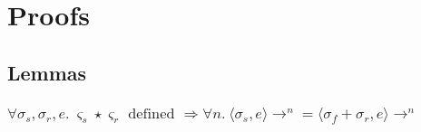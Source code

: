 \section{Proofs}

\subsection{Lemmas}

\subsubsection{$
    \forall \sigma_s, \sigma_r, e.\ \varsigma_s \star \varsigma_r \textrm{ defined }
    \Rightarrow \forall n.\ \langle \sigma_s, e \rangle \rightarrow^n =
    \langle \sigma_f + \sigma_r , e \rangle \rightarrow^n
$}\label{frame}

